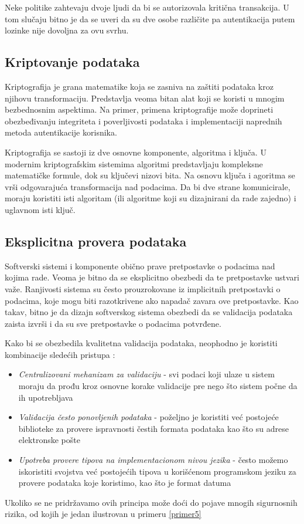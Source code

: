 \documentclass[a4paper]{article}
\begin{document}
Neke politike zahtevaju dvoje ljudi da bi se autorizovala kritična transakcija. U tom slučaju 
bitno je da se uveri da su dve osobe različite pa autentikacija putem lozinke nije dovoljna za ovu svrhu.

\subsection{Kriptovanje podataka}

Kriptografija \cite{CRYP} je grana matematike koja se zasniva na zaštiti podataka kroz njihovu transformaciju. Predstavlja veoma bitan alat koji se koristi u mnogim bezbednosnim aspektima. Na primer, primena kriptografije može doprineti obezbeđivanju integriteta i poverljivosti podataka i implementaciji naprednih metoda autentikacije korisnika.

Kriptografija se sastoji iz dve osnovne komponente, algoritma i ključa. U modernim kriptografskim sistemima algoritmi predstavljaju kompleksne matematičke formule, dok su ključevi nizovi bita. Na osnovu ključa i agoritma se  vrši odgovarajuća transformacija nad podacima. Da bi dve strane komunicirale, moraju koristiti isti algoritam (ili algoritme koji su dizajnirani da rade zajedno) i uglavnom isti ključ.

\subsection{Eksplicitna provera podataka}

Softverski sistemi i komponente obično prave pretpostavke o podacima nad kojima rade. Veoma je bitno da se eksplicitno obezbedi da te pretpostavke ustvari važe. Ranjivosti sistema su često prouzrokovane iz implicitnih pretpostavki o podacima, koje mogu biti razotkrivene ako napadač zavara ove pretpostavke.
Kao takav, bitno je da dizajn softverskog sistema obezbedi da se validacija podataka zaista izvrši i da su sve 
pretpostavke o podacima potvrđene.

Kako bi se obezbedila kvalitetna validacija podataka, neophodno je koristiti kombinacije sledećih pristupa \cite{Top10Flaws}:
\begin{itemize}
	\item \textit{Centralizovani mehanizam za validaciju} - svi podaci koji ulaze u sistem moraju da prođu kroz osnovne korake validacije pre nego što sistem počne da ih upotrebljava
	\item \textit{Validacija često ponovljenih podataka} - poželjno je koristiti već postojeće biblioteke za provere ispravnosti čestih formata podataka kao što su adrese elektronske pošte
	\item \textit{Upotreba provere tipova na implementacionom nivou jezika} - često možemo iskoristiti svojstva već postojećih tipova u korišćenom programskom jeziku za provere podataka koje koristimo, kao što je format datuma
\end{itemize}
Ukoliko se ne pridržavamo ovih principa može doći do pojave mnogih sigurnosnih rizika, od kojih je jedan ilustrovan u primeru \ref{primer5}
\end{document}
